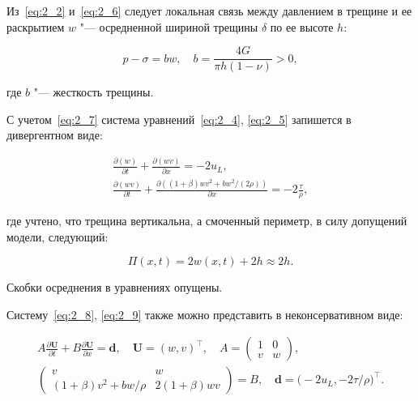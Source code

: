 Из~\eqref{eq:2_2} и~\eqref{eq:2_6} следует локальная связь между давлением в трещине и ее раскрытием $w$ "--- осредненной шириной трещины $\delta$ по ее высоте $h$:

\begin{equation}

p - \sigma = bw, \quad  b  = \frac{4G}{\pi h (1-\nu)} >0, \label{eq:2_7}

\end{equation}

где $b$ "--- жесткость трещины.



С учетом~\eqref{eq:2_7} система уравнений~\eqref{eq:2_4}, \eqref{eq:2_5} запишется в дивергентном виде:

\begin{gather}

 \frac{\partial \left(w\right)}{\partial t} + \frac{\partial \left(wv\right)}{\partial x} = - 2 u_L, \label{eq:2_8} \\

 \frac{\partial \left(wv \right)}{\partial t} + \frac{\partial \left(\left(1+\beta\right) wv^2 + {bw^2}/({2\rho})  \right)}{\partial x} = -2\frac{\tau}{\rho}, \label{eq:2_9}

\end{gather}

где учтено, что трещина вертикальна, а смоченный периметр, в силу допущений модели, следующий: 

$$\Pi(x, t) = 2 w(x, t) + 2h \approx 2h.$$ 

Скобки осреднения в уравнениях опущены.



Систему~\eqref{eq:2_8}, \eqref{eq:2_9} также можно представить в неконсервативном виде:

\begin{gather}

A \frac{\partial {\boldsymbol  U}}{\partial t} + B \frac{\partial {\boldsymbol  U}}{\partial x} = {\boldsymbol  d}, \quad   {\boldsymbol  U}  = \left(w,v\right)^{\top} , \quad  A = \left(\begin{matrix}1 & 0 \\ v & w \end{matrix}\right), \label{eq:2_10} 

\\

\left( \begin{matrix}v & w \\  \left(1+\beta\right) v^2 + {bw}/{\rho} &  2\left(1+\beta\right)wv  \end{matrix}\right) = B , \quad  {\boldsymbol  d} = \bigl(-2u_L, -2 \textstyle {\tau}/{\rho}\bigr)^{\top}.\label{eq:2_11}

\end{gather}

